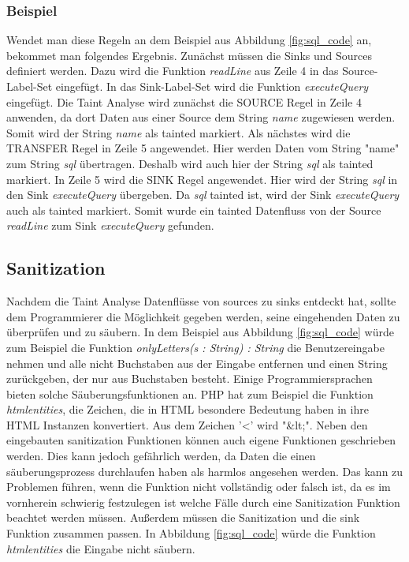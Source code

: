 \documentclass[runningheads]{llncs}
\begin{document}
\subsubsection{Beispiel}
Wendet man diese Regeln an dem Beispiel aus Abbildung \ref{fig:sql_code} an, bekommet man folgendes Ergebnis. Zunächst müssen die Sinks und Sources definiert werden. Dazu wird die Funktion \emph{readLine} aus Zeile 4 in das Source-Label-Set eingefügt. In das Sink-Label-Set wird die Funktion \emph{executeQuery} eingefügt. Die Taint Analyse wird zunächst die SOURCE Regel in Zeile 4 anwenden, da dort Daten aus einer Source dem String \emph{name} zugewiesen werden. Somit wird der String \emph{name} als tainted markiert. Als nächstes wird die TRANSFER Regel in Zeile 5 angewendet. Hier werden Daten vom String "name" zum String \emph{sql} übertragen. Deshalb wird auch hier der String \emph{sql} als tainted markiert. In Zeile 5 wird die SINK Regel angewendet. Hier wird der String \emph{sql} in den Sink \emph{executeQuery} übergeben. Da \emph{sql} tainted ist, wird der Sink \emph{executeQuery} auch als tainted markiert. Somit wurde ein tainted Datenfluss von der Source \emph{readLine} zum Sink \emph{executeQuery} gefunden.

\subsection{Sanitization}
Nachdem die Taint Analyse Datenflüsse von sources zu sinks entdeckt hat, sollte dem Programmierer die Möglichkeit gegeben werden, seine eingehenden Daten zu überprüfen und zu säubern. In dem Beispiel aus Abbildung \ref{fig:sql_code} würde zum Beispiel die Funktion \emph{onlyLetters(s : String) : String} die Benutzereingabe nehmen und alle nicht Buchstaben aus der Eingabe entfernen und einen String zurückgeben, der nur aus Buchstaben besteht. Einige Programmiersprachen bieten solche Säuberungsfunktionen an. PHP hat zum Beispiel die Funktion \emph{htmlentities}, die Zeichen, die in HTML besondere Bedeutung haben in ihre HTML Instanzen konvertiert. Aus dem Zeichen '\textless' wird "\&lt;".
Neben den eingebauten sanitization Funktionen können auch eigene Funktionen geschrieben werden. Dies kann jedoch gefährlich werden, da Daten die einen säuberungsprozess durchlaufen haben als harmlos angesehen werden. Das kann zu Problemen führen, wenn die Funktion nicht vollständig oder falsch ist, da es im vornherein schwierig festzulegen ist welche Fälle durch eine Sanitization Funktion beachtet werden müssen. Außerdem müssen die Sanitization und die sink Funktion zusammen passen. In Abbildung \ref{fig:sql_code} würde die Funktion \emph{htmlentities} die Eingabe nicht säubern. 
\end{document}

